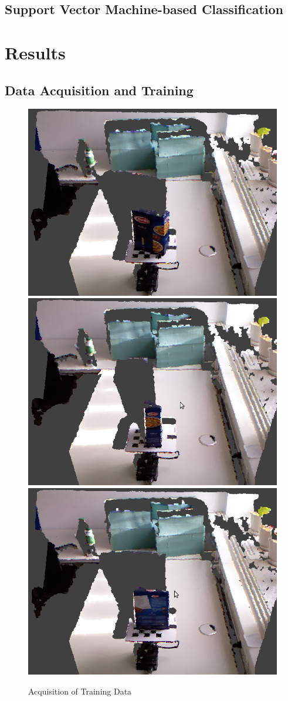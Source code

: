 \documentclass[conference]{sty/IEEEtran}
\begin{document}
\subsection{Support Vector Machine-based Classification}

\section{Results}

\subsection{Data Acquisition and Training}
\begin{figure}[htb!]
  \begin{center}
    \includegraphics[width=.45\columnwidth]{figures/rot_table/barilla.png}
\hfill
    \includegraphics[width=.45\columnwidth]{figures/rot_table/barilla1.png} \\
    \includegraphics[width=.45\columnwidth]{figures/rot_table/barilla2.png}
\caption{Acquisition of Training Data}
    \label{fig:data_acquisition}
  \end{center}
\end{figure}
\end{document}
